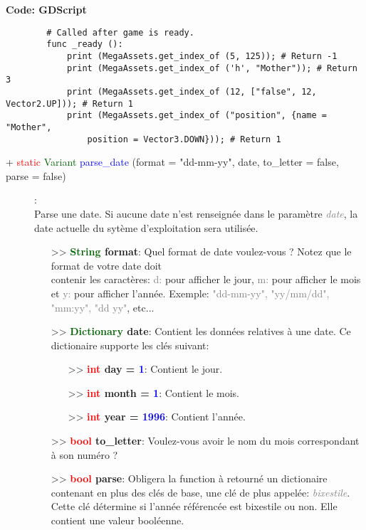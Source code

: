 \documentclass[a4paper, 11pt]{article}
\begin{document}
	\textbf{Code: GDScript}
	\begin{lstlisting}
		# Called after game is ready.
		func _ready ():
			print (MegaAssets.get_index_of (5, 125)); # Return -1
			print (MegaAssets.get_index_of ('h', "Mother")); # Return 3
			print (MegaAssets.get_index_of (12, ["false", 12, Vector2.UP])); # Return 1
			print (MegaAssets.get_index_of ("position", {name = "Mother",
				position = Vector3.DOWN})); # Return 1
	\end{lstlisting}
	\begin{description}
		\item [+ \textcolor{red}{static} \textcolor{darkgreen}{Variant} \textcolor{blue}{parse\_date} 
		(format = "dd-mm-yy", date, to\_letter = false, parse = false)]: \\Parse une date. Si aucune date 
		n'est renseignée dans le paramètre \textit{\textcolor{gray}{date}}, la date actuelle du sytème 
		d'exploitation sera utilisée.
		\begin{itemize}
			\item [>> \textbf{\textcolor{darkgreen}{String} format}:] Quel format de date voulez-vous ? 
			Notez que le format de votre date doit \\contenir les caractères: \textcolor{gray}{d:} pour 
			afficher le jour, \textcolor{gray}{m:} pour afficher le mois et \textcolor{gray}{y:} pour 
			afficher l'année. Exemple: \textcolor{gray}{"dd-mm-yy", "yy/mm/dd", "mm:yy", "dd yy"}, etc...
			\item [>> \textbf{\textcolor{darkgreen}{Dictionary} date}:] Contient les données relatives à une 
			date. Ce dictionaire supporte les clés suivant:
			\begin{itemize}
				\item[>> \textbf{\textcolor{red}{int} day = \textcolor{blue}{1}}:] Contient le jour.
				\item[>> \textbf{\textcolor{red}{int} month = \textcolor{blue}{1}}:] Contient le mois.
				\item[>> \textbf{\textcolor{red}{int} year = \textcolor{blue}{1996}}:] Contient l'année.
			\end{itemize}
			\item [>> \textbf{\textcolor{red}{bool} to\_letter}:] Voulez-vous avoir le nom du mois 
			correspondant à son numéro ?
			\item [>> \textbf{\textcolor{red}{bool} parse}:] Obligera la function à retourné un dictionaire
			contenant en plus des clés de base, une clé de plus appelée: \textit{\textcolor{gray}
			{bixestile}}. Cette clé détermine si l'année référencée est bixestile ou non. Elle contient une
			valeur booléenne.\\
		\end{itemize}
	\end{description}
\end{document}
